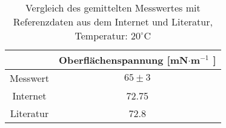 \begin{table}[H]
    \centering
		\caption[Vergleich]{Vergleich des gemittelten Messwertes mit \\Referenzdaten aus dem Internet und Literatur, Temperatur: $ 20^{\circ} $C}
		\begin{tabular}{|c|c|}
			\hline
			& Oberflächenspannung [mN$ \cdot $m$ ^{-1} $ ] \\
			\hline
			Messwert & $65\pm 3  $ \\
			\hline
			\hline
			Internet &  72.75\\
			\hline
			Literatur & 72.8 \\
			\hline
		\end{tabular}
		\label{tab: Vergleich}
\end{table}